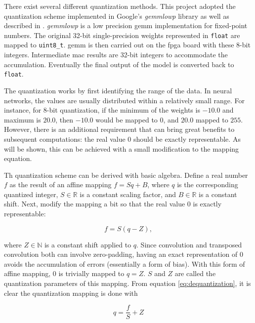There exist several different quantization methods. This project adopted the quantization scheme
implemented in Google's \textit{gemmlowp} library \cite{github:gemmlowp}
as well as described in \cite{DBLP:journals/corr/abs-1712-05877}. \textit{gemmlowp} is
a low precision \gls{gemm} implementation for fixed-point numbers.
The original 32-bit single-precision weights represented in \texttt{float} are mapped to 
\texttt{uint8_t}. \gls{gemm} is then
carried out on the \gls{fpga} board with these 8-bit integers. Intermediate \gls{mac} results are 32-bit
integers to accommodate the accumulation. Eventually the final output of the model is converted back to
\texttt{float}.

The quantization works by first identifying the range of the data. In neural networks, the values are usually
distributed within a relatively small range. For instance, for 8-bit quantization, if the minimum of the
weights is $-10.0$ and maximum is $20.0$, then $-10.0$ would be mapped to $0$, and $20.0$ mapped to $255$.
However, there is an additional requirement that can bring great benefits to subsequent computations:
the real value $0$ should be exactly representable. As will be shown, this can be achieved with a small
modification to the mapping equation.

Th quantization scheme can be derived with basic algebra. Define a real number $f$ as the result of an affine
mapping $f = S q + B$, where $q$ is the corresponding quantized integer, $S \in \mathbb{R}$ is a constant
scaling factor, and $B \in \mathbb{R}$ is a constant shift. Next, modify the mapping a bit so that the
real value $0$ is exactly representable:

\begin{equation} \label{eq:dequantization}
  f = S(q - Z),
\end{equation}

where $Z \in \mathbb{N}$ is a constant shift applied to $q$. Since convolution and transposed convolution
both can involve zero-padding, having an exact representation of $0$ avoids the accumulation of errors
(essentially a form of bias). With this form of affine mapping, $0$ is trivially mapped to $q = Z$. $S$ and
$Z$ are called the quantization parameters of this mapping. From equation \ref{eq:dequantization},
it is clear the quantization mapping is done with

\begin{equation} \label{eq:quantization}
  q = \frac{f}{S} + Z
\end{equation}

